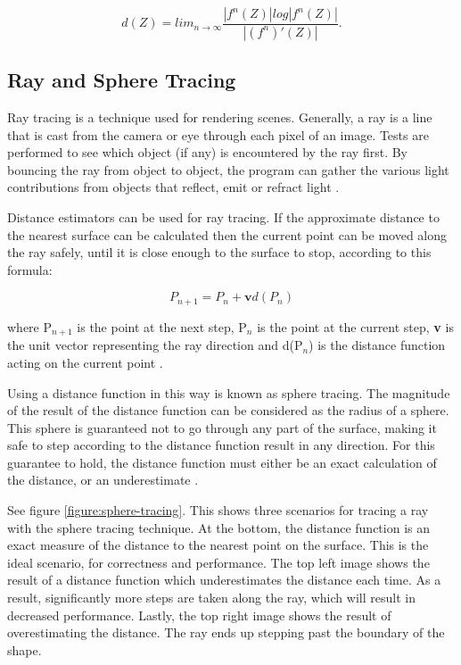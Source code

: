 \begin{equation} \label{equation:final-distance-estimate}
	d(Z) = {lim_{n\rightarrow\infty}}\frac{|f^n(Z)|log|f^n(Z)|}{|(f^n)'(Z)|}.
\end{equation}

\subsection{Ray and Sphere Tracing}

Ray tracing is a technique used for rendering scenes. Generally, a ray is a line that is cast from the camera or eye through each pixel of an image. Tests are performed to see which object (if any) is encountered by the ray first. By bouncing the ray from object to object, the program can gather the various light contributions from objects that reflect, emit or refract light \cite{haines2019ray}.\newline

Distance estimators can be used for ray tracing. If the approximate distance to the nearest surface can be calculated then the current point can be moved along the ray safely, until it is close enough to the surface to stop, according to this formula:

\begin{equation} \label{equation:sphere-tracing}
	{P_{n+1}} = {P_n} + \textbf{v}d({P_n})
\end{equation}

where P$_{n+1}$ is the point at the next step, P$_n$ is the point at the current step, \textbf{v} is the unit vector representing the ray direction and d(P$_n$) is the distance function acting on the current point \cite{marrs2021ray}.\newline

Using a distance function in this way is known as sphere tracing. The magnitude of the result of the distance function can be considered as the radius of a sphere. This sphere is guaranteed not to go through any part of the surface, making it safe to step according to the distance function result in any direction. For this guarantee to hold, the distance function must either be an exact calculation of the distance, or an underestimate \cite{hart1996sphere}.\newline

See figure \ref{figure:sphere-tracing}. This shows three scenarios for tracing a ray with the sphere tracing technique. At the bottom, the distance function is an exact measure of the distance to the nearest point on the surface. This is the ideal scenario, for correctness and performance. The top left image shows the result of a distance function which underestimates the distance each time. As a result, significantly more steps are taken along the ray, which will result in decreased performance. Lastly, the top right image shows the result of overestimating the distance. The ray ends up stepping past the boundary of the shape.

